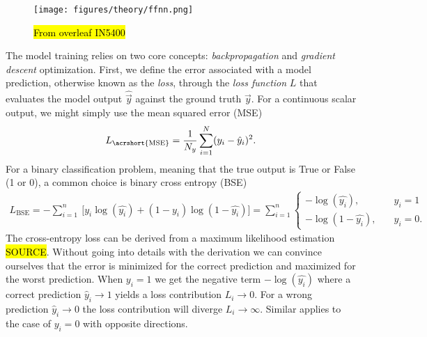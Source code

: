 \begin{figure}[H]
  \centering
  \texttt{[image: figures/theory/ffnn.png]}
  \caption{\hl{From overleaf IN5400}}
  \label{fig:ffnn}
\end{figure}
The model training relies on two core concepts: \textit{backpropagation} and \textit{gradient descent} optimization. First, we define the error associated with a model prediction, otherwise known as the \textit{loss}, through the \textit{loss function} $L$ that evaluates the model output $\hat{\vec{y}}$ against the ground truth $\vec{y}$. For a continuous scalar output, we might simply use the mean squared error (\acrshort{MSE})
\begin{align*}
  L_{\text{\acrshort{MSE}}} = \frac{1}{N_y} \sum_{i = 1}^N (y_i - \hat{y}_i)^2.
\end{align*}
For a binary classification problem, meaning that the true output is True or False (1 or 0), a common choice is binary cross entropy (BSE)
\begin{align*}
  L_{\text{BSE}} =  -\sum_{i=1}^n \ \Big[y_i\log(\hat{y_i}) + (1-y_i)\log(1 - \hat{y_i}) \Big] =  \sum_{i=1}^n   \begin{cases}
    - \log{(\hat{y_i})},& \quad y_i = 1 \\
    -\log{(1-\hat{y_i})},& \quad y_i = 0.
\end{cases}
\end{align*}
The cross-entropy loss can be derived from a maximum likelihood estimation \hl{SOURCE}. Without going into details with the derivation we can convince ourselves that the error is minimized for the correct prediction and maximized for the worst prediction. When $y_i = 1$ we get the negative term $-\log(\hat{y_i})$ where a correct prediction $\hat{y}_i \to 1$ yields a loss contribution $L_i \to 0$. For a wrong prediction $\hat{y}_i \to 0$ the loss contribution will diverge $L_i \to \infty$. Similar applies to the case of $y_i = 0$ with opposite directions. 

